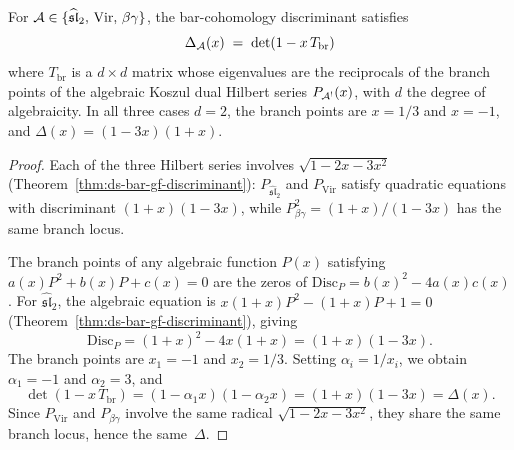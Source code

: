 \begin{theorem}
\label{thm:discriminant-spectral-verified}
For $\mathcal{A} \in \{\widehat{\mathfrak{sl}}_2,\, \mathrm{Vir},\,
\beta\gamma\}$, the bar-cohomology discriminant satisfies
\[
\Delta_{\mathcal{A}}(x) \;=\; \det(1 - x\, T_{\mathrm{br}})
\]
where $T_{\mathrm{br}}$ is a $d \times d$ matrix whose eigenvalues
are the reciprocals of the branch points of the algebraic Koszul
dual Hilbert series $P_{\mathcal{A}^!}(x)$, with $d$ the degree of
algebraicity.
In all three cases $d = 2$, the branch points are $x = 1/3$
and $x = -1$, and
$\Delta(x) = (1 - 3x)(1 + x)$.
\end{theorem}

\begin{proof}
Each of the three Hilbert series involves $\sqrt{1 - 2x - 3x^2}$
(Theorem~\ref{thm:ds-bar-gf-discriminant}):
$P_{\widehat{\mathfrak{sl}}_2}$ and $P_{\mathrm{Vir}}$ satisfy
quadratic equations with discriminant $(1+x)(1-3x)$, while
$P_{\beta\gamma}^2 = (1+x)/(1-3x)$ has the same branch locus.

The branch points of any algebraic function $P(x)$ satisfying
$a(x)P^2 + b(x)P + c(x) = 0$ are the zeros of
$\mathrm{Disc}_P = b(x)^2 - 4a(x)c(x)$.  For
$\widehat{\mathfrak{sl}}_2$, the algebraic equation is
$x(1+x)P^2 - (1+x)P + 1 = 0$
(Theorem~\ref{thm:ds-bar-gf-discriminant}), giving
\[
\mathrm{Disc}_P = (1+x)^2 - 4x(1+x) = (1+x)(1-3x).
\]
The branch points are $x_1 = -1$ and $x_2 = 1/3$.
Setting $\alpha_i = 1/x_i$, we obtain $\alpha_1 = -1$ and
$\alpha_2 = 3$, and
\[
\det(1 - x\,T_{\mathrm{br}}) = (1 - \alpha_1 x)(1 - \alpha_2 x)
= (1+x)(1-3x) = \Delta(x).
\]
Since $P_{\mathrm{Vir}}$ and $P_{\beta\gamma}$ involve the same
radical $\sqrt{1-2x-3x^2}$, they share the same branch locus,
hence the same~$\Delta$.
\end{proof}

